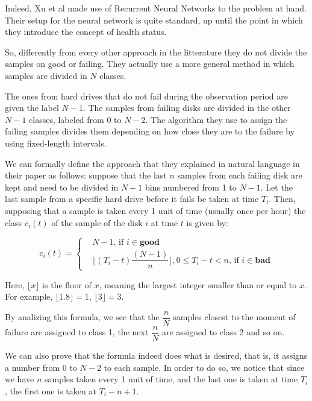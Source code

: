 Indeed, Xu et al \cite{Xu16} made use of Recurrent Neural Networks to the problem at hand.
Their setup for the neural network is quite standard, up until the point in which they introduce the concept of health status.

So, differently from every other approach in the litterature they do not divide the samples on good or failing.
They actually use a more general method in which samples are divided in $N$ classes.

The ones from hard drives that do not fail during the observation period are given the label $N-1$.
The samples from failing disks are divided in the other $N-1$ classes, labeled from $0$ to $N-2$.
The algorithm they use to assign the failing samples divides them depending on how close they are to the failure by using fixed-length intervals.

We can formally define the approach that they explained in natural language in their paper as follows:
suppose that the last $n$ samples from each failing disk are kept and need to be divided in $N-1$ bins numbered from 1 to $N-1$.
Let the last sample from a specific hard drive before it fails be taken at time $T_i$.
Then, supposing that a sample is taken every 1 unit of time (usually once per hour) the class $c_i(t)$ of the sample of the disk $i$ at time $t$ is given by:

\begin{equation}\label{eq:linear_discrete_health_status}
  c_i(t) = 
  \begin{cases}
    & N-1 \text{, if } i \in \mathbf{good} \\
    & \biggl\lfloor(T_i-t)\dfrac{(N-1)}{n}\biggr\rfloor, 0 \leq T_i - t < n \text{, if } i \in \mathbf{bad}
  \end{cases}
\end{equation}

Here, $\lfloor x \rfloor$ is the floor of $x$, meaning the largest integer smaller than or equal to $x$.
For example, $\lfloor 1.8 \rfloor = 1$, $\lfloor 3 \rfloor = 3$.

By analizing this formula, we see that the $\dfrac{n}{N}$ samples closest to the moment of failure are assigned to class 1, the next $\dfrac{n}{N}$ are assigned to class 2 and so on.

We can also prove that the formula indeed does what is desired, that is, it assigns a number from 0 to $N-2$ to each sample.
In order to do so, we notice that since we have $n$ samples taken every 1 unit of time, and the last one is taken at time $T_i$, the first one is taken at $T_i - n + 1$.

